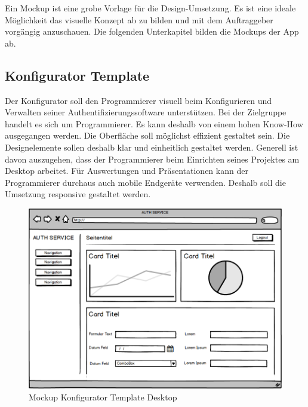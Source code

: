 Ein Mockup ist eine grobe Vorlage für die Design-Umsetzung. Es ist eine
ideale Möglichkeit das visuelle Konzept ab zu bilden und mit dem
Auftraggeber vorgängig anzuschauen. Die folgenden Unterkapitel bilden
die Mockups der App ab.

\hypertarget{konfigurator-template}{\subsection{Konfigurator
Template}\label{konfigurator-template}}

Der Konfigurator soll den Programmierer visuell beim Konfigurieren und
Verwalten seiner Authentifizierungssoftware unterstützen. Bei der
Zielgruppe handelt es sich um Programmierer. Es kann deshalb von einem
hohen Know-How ausgegangen werden. Die Oberfläche soll möglichst
effizient gestaltet sein. Die Designelemente sollen deshalb klar und
einheitlich gestaltet werden. Generell ist davon auszugehen, dass der
Programmierer beim Einrichten seines Projektes am Desktop arbeitet. Für
Auswertungen und Präsentationen kann der Programmierer durchaus auch
mobile Endgeräte verwenden. Deshalb soll die Umsetzung responsive
gestaltet werden.

\begin{figure}[htbp]
\centering
\includegraphics{images/mockups/General.png}
\caption{Mockup Konfigurator Template Desktop}
\end{figure}

\newpage

